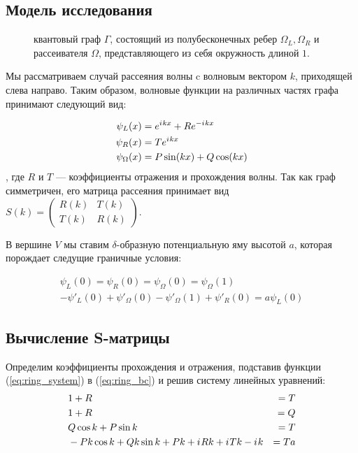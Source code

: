 \subsection{Модель исследования}
\begin{figure}[!htb] %
\begin{tikzpicture}[scale=0.8] %

\end{tikzpicture}
\caption{квантовый граф $\Gamma$, состоящий из полубесконечных ребер $\Omega_L, \Omega_R$ и рассеивателя $\Omega$, представляющего из себя окружность длиной $1$.}
\end{figure}

Мы рассматриваем случай рассеяния волны c волновым вектором $k$, приходящей слева направо. Таким образом, волновые функции на различных частях графа принимают следующий вид:

\begin{equation}\label{eq:ring_system}
\begin{aligned}
\psi_L(x) &= \eexp{\iu k x} + R \eexp{-\iu k x} \\
\psi_R(x) &= T \eexp{\iu k x}\\
\psi_\Omega(x) &= P \sin(k x) + Q \cos(k x)
\end{aligned}
\end{equation}
, где $R$ и $T$ — коэффициенты отражения и прохождения волны. Так как граф симметричен, его матрица рассеяния принимает вид
$S(k) = \begin{pmatrix} R(k) & T(k) \\ T(k) & R(k) \end{pmatrix}$.

В вершине $V$ мы ставим $\delta$-образную потенциальную яму высотой $a$, которая порождает следущие граничные условия:

\begin{equation}\label{eq:ring_bc}
\begin{aligned}
\psi_L(0) = \psi_R(0) = \psi_\Omega(0) = \psi_\Omega(1) \\ 
-\psi'_L(0) + \psi'_\Omega(0) - \psi'_\Omega(1) + \psi'_R(0) = a \psi_L(0)
\end{aligned}
\end{equation}


\subsection{Вычисление S-матрицы}
Определим коэффициенты прохождения и отражения, подставив функции (\ref{eq:ring_system}) в (\ref{eq:ring_bc}) и решив систему линейных уравнений:
\begin{align*}
& 1 + R &= T \\
& 1 + R &= Q \\
& Q \cos k + P \sin k &= T \\
& -P k \cos k + Q k \sin k + P k + \iu R k + \iu T k - \iu k &= T a
\end{align*}

